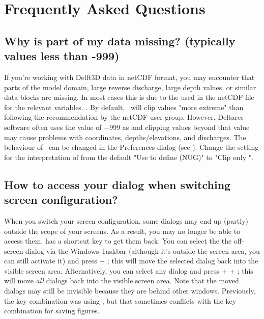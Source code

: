

\chapter{Frequently Asked Questions} \label{Chp:FAQ}

\section{Why is part of my data missing? (typically values less than -999)} \label{FAQ:fillValue}
If you're working with Delft3D data in netCDF format, you may encounter that parts of the model domain, large reverse discharge, large depth values, or similar data blocks are missing.
In most cases this is due to the  used in the netCDF file for the relevant variables.
.
By default, \QUICKPLOT\ will clip values "more extreme" than  following the recommendation by the netCDF user group.
However, Deltares software often uses the value of \num{-999} as  and clipping values beyond that value may cause problems with coordinates, depths/elevations, and discharges.
The behaviour of \QUICKPLOT\ can be changed in the Preferences dialog (see ).
Change the setting for the interpretation of  from the default "Use  to define  (NUG)" to "Clip only ".

\section{How to access your dialog when switching screen configuration?} \label{FAQ:missingDialog}
When you switch your screen configuration, some \QUICKPLOT dialogs may end up (partly) outside the scope of your screens.
As a result, you may no longer be able to access them.
\QUICKPLOT has a shortcut key to get them back.
You can select the the off-screen dialog via the Windows Taskbar (although it's outside the screen area, you can still activate it) and press  + ; this will move the selected dialog back into the visible screen area.
Alternatively, you can select any \QUICKPLOT dialog and press  +  + ; this will move \emph{all} \QUICKPLOT dialogs back into the visible screen area.
Note that the moved dialogs may still be invisible because they are behind other windows.
Previously, the key combination was using , but that sometimes conflicts with the key combination for saving figures.